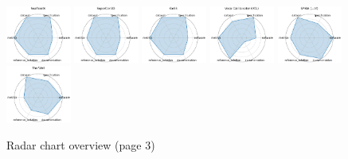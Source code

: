 \begin{figure}[ht!]
\\[1ex]
\includegraphics[width=0.1900\textwidth]{images/seafloorai_radar.pdf}
\includegraphics[width=0.1900\textwidth]{images/supercond_radar.pdf}
\includegraphics[width=0.1900\textwidth]{images/gess_radar.pdf}
\includegraphics[width=0.1900\textwidth]{images/vocal_call_locator_vcl_radar.pdf}
\includegraphics[width=0.1900\textwidth]{images/spiqa_llm_radar.pdf}
\\[1ex]
\includegraphics[width=0.1900\textwidth]{images/the_well_radar.pdf}
\caption{Radar chart overview (page 3)}
\end{figure}


